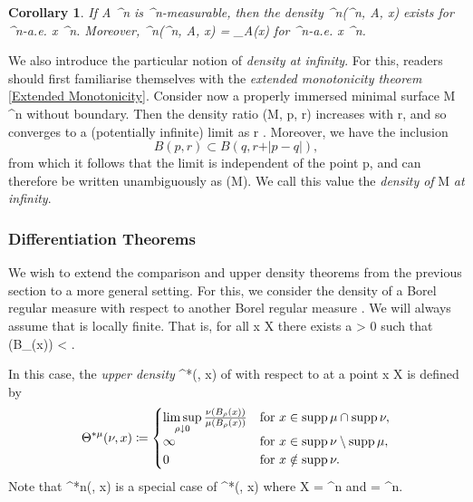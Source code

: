 \documentclass[a4paper, 11pt]{article}
\theoremstyle{plain}
\newtheorem{corollary}[theorem]{Corollary}
\theoremstyle{definition}
\theoremstyle{remark}
\numberwithin{equation}{subsection}
\def\({}
\def\){}
\begin{document}
\begin{corollary}
If \(A \subset {}^{n}\) is \(^{n}\)-measurable, then the density \(\Theta^{n}(^{n}, A, x)\) exists for \(^{n}\)-a.e. \(x \in {}^{n}\). Moreover, \(\Theta^{n}(^{n}, A, x) = _{A}(x)\) for \(^{n}\)-a.e. \(x \in {}^{n}\).
\end{corollary}

We also introduce the particular notion of \emph{density at infinity}. For this, readers should first familiarise themselves with the \emph{extended monotonicity theorem} \ref{Extended Monotonicity}. Consider now a properly immersed minimal surface \(M \in {}^{n}\) without boundary. Then the density ratio \(\Theta(M, p, r)\) increases with \(r\), and so converges to a (potentially infinite) limit as \(r \rightarrow \infty\). Moreover, we have the inclusion
\begin{equation}
B(p,r) \subset B(q, r + \vert p-q \vert),
\end{equation}
from which it follows that the limit is independent of the point p, and can therefore be written unambiguously as \(\Theta(M)\). We call this value the \emph{density of} M \emph{at infinity}.

\subsubsection{Differentiation Theorems}

We wish to extend the comparison and upper density theorems from the previous section to a more general setting. For this, we consider the density of a Borel regular measure \(\nu\) with respect to another Borel regular measure \(\mu\). We will always assume that \(\mu\) is locally finite. That is, for all \(x \in X\) there exists a \(\rho > 0\) such that \(\mu(B_{\rho}(x)) < \infty\).

In this case, the \emph{upper density} \(\Theta^{*\mu}(\nu, x)\) of \(\nu\) with respect to \(\mu\) at a point \(x \in X\) is defined by
\begin{equation}
\Theta^{*\mu}(\nu, x) \coloneq
\begin{cases}
\limsup\limits_{\smash{\rho \downarrow 0}} \frac{\nu(B_{\rho}(x))}{\mu(B_{\rho}(x))} & \text{for } x \in \operatorname{supp} \mu \cap \operatorname{supp} \nu, \\
\infty & \text{for } x \in \operatorname{supp} \nu \setminus \operatorname{supp} \mu, \\
0 & \text{for } x \notin \operatorname{supp} \nu.
\end{cases}
\end{equation}
Note that \(\Theta^{*n}(\mu, x)\) is a special case of \(\Theta^{*\mu}(\nu, x)\) where \(X = ^{n}\) and \(\mu = ^{n}\).
\end{document}
